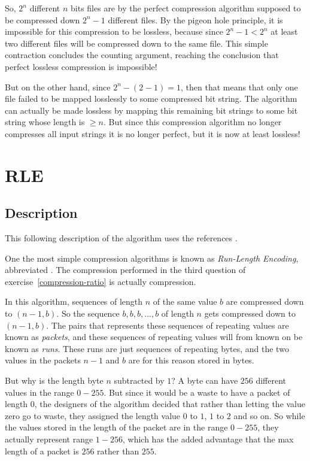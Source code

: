 So, $2^n$ different $n$ bits files are by the perfect compression
algorithm supposed to be compressed down $2^n - 1$ different files. By
the pigeon hole principle, it is impossible for this compression to be
lossless, because since $2^n - 1 < 2^n$ at least two different files
will be compressed down to the same file. This simple contraction
concludes the counting argument, reaching the conclusion that perfect
lossless compression is impossible!

But on the other hand, since $2^n - (2^{} - 1) = 1$, then that means
that only one file failed to be mapped losslessly to some compressed
bit string. The algorithm can actually be made lossless by mapping
this remaining bit strings to some bit string whose length is $\ge
n$. But since this compression algorithm no longer compresses all
input strings it is no longer perfect, but it is now at least
lossless!

\section{RLE}
\label{sec:rle}

\subsection{Description}

This following description of the \rle algorithm uses the references
\cite{nagarajan11:_enhan_approac_run_lengt_encod_schem,murray1996encyclopedia,mark1996data_compression_book}.

One the most simple compression algorithms is known as
\textit{Run-Length Encoding}, abbreviated \rle. The compression
performed in the third question of exercise~\ref{compression-ratio} is
actually \rle compression.

In this algorithm, sequences of length $n$ of the same value $b$ are
compressed down to $(n-1,b)$. So the sequence $b,b,b,...,b$ of length
$n$ gets compressed down to $(n-1,b)$. The pairs that represents these
sequences of repeating values are known as \textit{packets}, and these
sequences of repeating values will from known on be known as
\textit{runs}. These runs are just sequences of repeating bytes, and
the two values in the packets $n-1$ and $b$ are for this reason stored
in bytes.

But why is the length byte $n$ subtracted by $1$?  A byte can have
$256$ different values in the range $0-255$. But since it would be a
waste to have a packet of length $0$, the designers of the algorithm
decided that rather than letting the value zero go to waste, they
assigned the length value $0$ to $1$, $1$ to $2$ and so on. So while
the values stored in the length of the packet are in the range
$0-255$, they actually represent range $1-256$, which has the added
advantage that the max length of a packet is $256$ rather than $255$.

